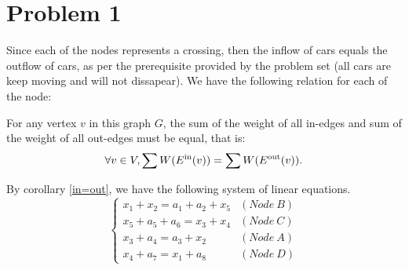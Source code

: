 \documentclass[12pt,a4paper]{article}
\begin{document}
\section*{Problem 1}
\begin{solution}
Since each of the nodes represents a crossing, then the inflow of cars equals the outflow of cars, as per the prerequisite provided by the problem set (all cars are keep moving and will not dissapear). We have the following relation for each of the node:
\begin{corollary}\label{in=out}
For any vertex $v$ in this graph $G$, the sum of the weight of all in-edges and sum of the weight of all out-edges must be equal, that is:
    $$\forall v \in V, \sum W(E^{\text{in}}(v)) = \sum W(E^{\text{out}}(v)).$$
\end{corollary}

By corollary \ref{in=out}, we have the following system of linear equations.
\begin{equation}\label{nodes_relations}
    \begin{cases}
x_{1} +x_{2} =a_{1} +a_{2} +x_{5} & ( Node\ B)\\
x_{5} +a_{5} +a_{6} =x_{3} +x_{4} & ( Node\ C)\\
x_{3} +a_{4} =a_{3} +x_{2} & ( Node\ A)\\
x_{4} +a_{7} =x_{1} +a_{8} & ( Node\ D)
\end{cases}
\end{equation}



\end{solution}
\end{document}
